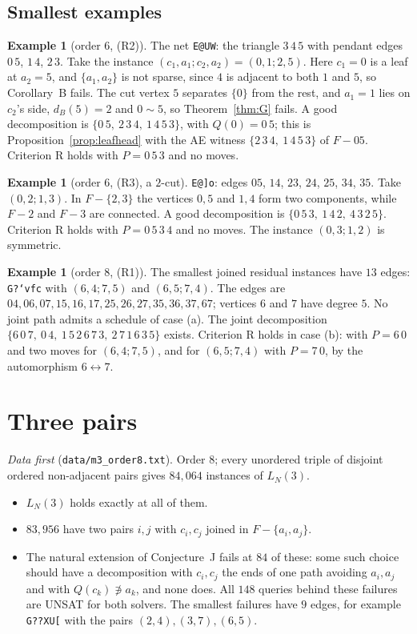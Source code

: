 \documentclass[11pt]{amsart}
\theoremstyle{definition}
\newtheorem{example}[theorem]{Example}
\begin{document}
\subsection*{Smallest examples}
\begin{example}[order $6$, (R2)]\label{ex:net}
The net \texttt{E@UW}: the triangle $3\,4\,5$ with pendant edges $0\,5$, $1\,4$, $2\,3$. Take the
instance $(c_1,a_1;c_2,a_2)=(0,1;2,5)$. Here $c_1=0$ is a leaf at $a_2=5$, and $\{a_1,a_2\}$ is not sparse,
since $4$ is adjacent to both $1$ and $5$, so Corollary~B fails. The cut vertex $5$ separates $\{0\}$ from
the rest, and $a_1=1$ lies on $c_2$'s side, $d_B(5)=2$ and $0\sim5$, so Theorem~\ref{thm:G} fails. A good
decomposition is $\{0\,5,\ 2\,3\,4,\ 1\,4\,5\,3\}$, with $Q(0)=0\,5$; this is
Proposition~\ref{prop:leafhead} with the AE witness $\{2\,3\,4,\ 1\,4\,5\,3\}$ of $F-05$. Criterion R
holds with $P=0\,5\,3$ and no moves.
\end{example}

\begin{example}[order $6$, (R3), a $2$-cut]\label{ex:2cut}
\texttt{E@]o}: edges $05$, $14$, $23$, $24$, $25$, $34$, $35$. Take $(0,2;1,3)$. In $F-\{2,3\}$ the vertices $0,5$
and $1,4$ form two components, while $F-2$ and $F-3$ are connected. A good decomposition is $\{0\,5\,3,\ 1\,4\,2,\ 4\,3\,2\,5\}$.
Criterion R holds with $P=0\,5\,3\,4$ and no moves. The instance $(0,3;1,2)$ is symmetric.
\end{example}

\begin{example}[order $8$, (R1)]\label{ex:dense}
The smallest joined residual instances have $13$ edges: \texttt{G?`vfc} with $(6,4;7,5)$ and
$(6,5;7,4)$. The edges are $04,06,07,15,16,17,25,26,27,35,36,37,67$; vertices $6$ and $7$ have degree $5$. No joint
path admits a schedule of case (a). The joint decomposition $\{6\,0\,7,\ 0\,4,\ 1\,5\,2\,6\,7\,3,\
2\,7\,1\,6\,3\,5\}$ exists. Criterion R holds in case (b): with $P=6\,0$ and two moves for $(6,4;7,5)$,
and for $(6,5;7,4)$ with $P=7\,0$, by the automorphism $6\leftrightarrow7$.
\end{example}

\section{Three pairs}\label{sec:m3}

\emph{Data first} (\texttt{data/m3\_order8.txt}). Order $8$; every unordered triple of disjoint
ordered non-adjacent pairs gives $84{,}064$ instances of $L_N(3)$.
\begin{itemize}
\item $L_N(3)$ holds exactly at all of them.
\item $83{,}956$ have two pairs $i,j$ with $c_i,c_j$ joined in $F-\{a_i,a_j\}$.
\item The natural extension of Conjecture~J fails at $84$ of these: some such choice should have a decomposition with $c_i,c_j$ the ends of one path avoiding
$a_i,a_j$ and with $Q(c_k)\not\ni a_k$, and none does. All $148$ queries behind these failures are
UNSAT for both solvers. The smallest failures have $9$ edges, for example \texttt{G??XU[} with the pairs
$(2,4),(3,7),(6,5)$.
\end{itemize}
\end{document}
